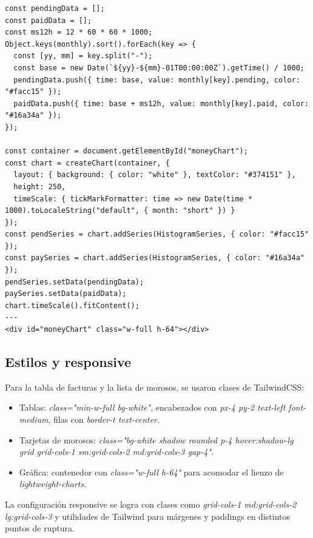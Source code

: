 \begin{large}
\begin{verbatim}
const pendingData = [];
const paidData = [];
const ms12h = 12 * 60 * 60 * 1000;
Object.keys(monthly).sort().forEach(key => {
  const [yy, mm] = key.split("-");
  const base = new Date(`${yy}-${mm}-01T00:00:00Z`).getTime() / 1000;
  pendingData.push({ time: base, value: monthly[key].pending, color: "#facc15" });
  paidData.push({ time: base + ms12h, value: monthly[key].paid, color: "#16a34a" });
});

const container = document.getElementById("moneyChart");
const chart = createChart(container, {
  layout: { background: { color: "white" }, textColor: "#374151" },
  height: 250,
  timeScale: { tickMarkFormatter: time => new Date(time * 1000).toLocaleString("default", { month: "short" }) }
});
const pendSeries = chart.addSeries(HistogramSeries, { color: "#facc15" });
const paySeries = chart.addSeries(HistogramSeries, { color: "#16a34a" });
pendSeries.setData(pendingData);
paySeries.setData(paidData);
chart.timeScale().fitContent();
---
<div id="moneyChart" class="w-full h-64"></div>
\end{verbatim}

\end{large}

\subsection{Estilos y responsive}

\begin{large}

Para la tabla de facturas y la lista de morosos, se usaron clases de TailwindCSS:

\begin{itemize}
  \item Tablas: \textit{class="min-w-full bg-white"}, encabezados con \textit{px-4 py-2 text-left font-medium}, filas con \textit{border-t text-center}.
  \item Tarjetas de morosos: \textit{class="bg-white shadow rounded p-4 hover:shadow-lg grid grid-cols-1 sm:grid-cols-2 md:grid-cols-3 gap-4"}.
  \item Gráfica: contenedor con \textit{class="w-full h-64"} para acomodar el lienzo de \emph{lightweight-charts}.
\end{itemize}

La configuración responsive se logra con clases como \textit{grid-cols-1 md:grid-cols-2 lg:grid-cols-3} y utilidades de Tailwind para márgenes y paddings en distintos puntos de ruptura.

\end{large}

